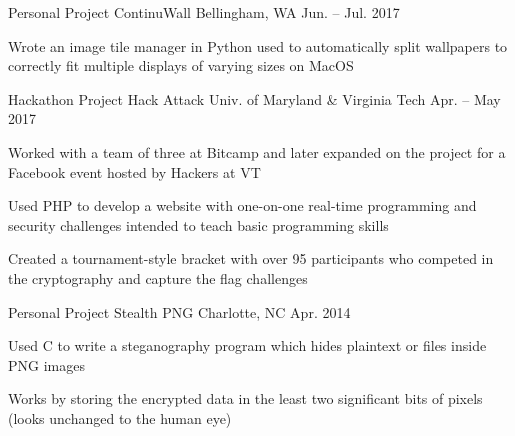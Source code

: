 

\begin{cventries}

  \cventry
    {Personal Project} %
    {ContinuWall} %
    {Bellingham, WA} %
    {Jun. – Jul. 2017} %
    {
      \begin{cvitems} %
      \item {Wrote an image tile manager in Python used to automatically split wallpapers to correctly fit multiple displays of varying sizes on MacOS}
      \end{cvitems}
    }

  \cventry
    {Hackathon Project} %
    {Hack Attack} %
    {Univ. of Maryland \& Virginia Tech} %
    {Apr. – May 2017} %
    {
      \begin{cvitems} %
      \item {Worked with a team of three at Bitcamp and later expanded on the project for a Facebook event hosted by Hackers at VT}
      \item {Used PHP to develop a website with one-on-one real-time programming and security challenges intended to teach basic programming skills}
      \item {Created a tournament-style bracket with over 95 participants who competed in the cryptography and capture the flag challenges}
      \end{cvitems}
    }

  \cventry
    {Personal Project} %
    {Stealth PNG} %
    {Charlotte, NC} %
    {Apr. 2014} %
    {
      \begin{cvitems} %
      \item {Used C to write a steganography program which hides plaintext or files inside PNG images}
      \item {Works by storing the encrypted data in the least two significant bits of pixels (looks unchanged to the human eye)}
      \end{cvitems}
    }

\end{cventries}
